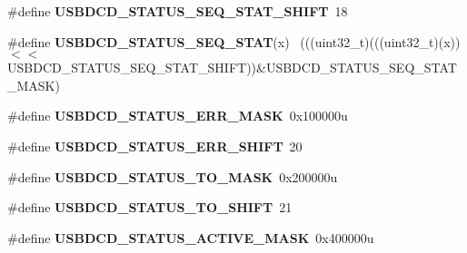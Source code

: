 \begin{DoxyCompactItemize}
\item 
\hypertarget{group___u_s_b_d_c_d___register___masks_ga8e3d04ac9b5b6195f765f29f82264376}{}\#define {\bfseries U\+S\+B\+D\+C\+D\+\_\+\+S\+T\+A\+T\+U\+S\+\_\+\+S\+E\+Q\+\_\+\+S\+T\+A\+T\+\_\+\+S\+H\+I\+F\+T}~18\label{group___u_s_b_d_c_d___register___masks_ga8e3d04ac9b5b6195f765f29f82264376}

\item 
\hypertarget{group___u_s_b_d_c_d___register___masks_ga93cf6b08b2e1b96dbb2713bf57042eab}{}\#define {\bfseries U\+S\+B\+D\+C\+D\+\_\+\+S\+T\+A\+T\+U\+S\+\_\+\+S\+E\+Q\+\_\+\+S\+T\+A\+T}(x)                            ~(((uint32\+\_\+t)(((uint32\+\_\+t)(x))$<$$<$U\+S\+B\+D\+C\+D\+\_\+\+S\+T\+A\+T\+U\+S\+\_\+\+S\+E\+Q\+\_\+\+S\+T\+A\+T\+\_\+\+S\+H\+I\+F\+T))\&U\+S\+B\+D\+C\+D\+\_\+\+S\+T\+A\+T\+U\+S\+\_\+\+S\+E\+Q\+\_\+\+S\+T\+A\+T\+\_\+\+M\+A\+S\+K)\label{group___u_s_b_d_c_d___register___masks_ga93cf6b08b2e1b96dbb2713bf57042eab}

\item 
\hypertarget{group___u_s_b_d_c_d___register___masks_gaa0a0297c32e8af91d40e8cba8ffe8d1e}{}\#define {\bfseries U\+S\+B\+D\+C\+D\+\_\+\+S\+T\+A\+T\+U\+S\+\_\+\+E\+R\+R\+\_\+\+M\+A\+S\+K}~0x100000u\label{group___u_s_b_d_c_d___register___masks_gaa0a0297c32e8af91d40e8cba8ffe8d1e}

\item 
\hypertarget{group___u_s_b_d_c_d___register___masks_gac82e47386e1af144b9e4d579bacfca50}{}\#define {\bfseries U\+S\+B\+D\+C\+D\+\_\+\+S\+T\+A\+T\+U\+S\+\_\+\+E\+R\+R\+\_\+\+S\+H\+I\+F\+T}~20\label{group___u_s_b_d_c_d___register___masks_gac82e47386e1af144b9e4d579bacfca50}

\item 
\hypertarget{group___u_s_b_d_c_d___register___masks_ga69616f9e6fd32921dee0543a3cfde633}{}\#define {\bfseries U\+S\+B\+D\+C\+D\+\_\+\+S\+T\+A\+T\+U\+S\+\_\+\+T\+O\+\_\+\+M\+A\+S\+K}~0x200000u\label{group___u_s_b_d_c_d___register___masks_ga69616f9e6fd32921dee0543a3cfde633}

\item 
\hypertarget{group___u_s_b_d_c_d___register___masks_ga2b59871476643f7c428868c6ebbcef5a}{}\#define {\bfseries U\+S\+B\+D\+C\+D\+\_\+\+S\+T\+A\+T\+U\+S\+\_\+\+T\+O\+\_\+\+S\+H\+I\+F\+T}~21\label{group___u_s_b_d_c_d___register___masks_ga2b59871476643f7c428868c6ebbcef5a}

\item 
\hypertarget{group___u_s_b_d_c_d___register___masks_ga6127ac2a4e36e01dfe2c939203f8a72f}{}\#define {\bfseries U\+S\+B\+D\+C\+D\+\_\+\+S\+T\+A\+T\+U\+S\+\_\+\+A\+C\+T\+I\+V\+E\+\_\+\+M\+A\+S\+K}~0x400000u\label{group___u_s_b_d_c_d___register___masks_ga6127ac2a4e36e01dfe2c939203f8a72f}


\end{DoxyCompactItemize}
